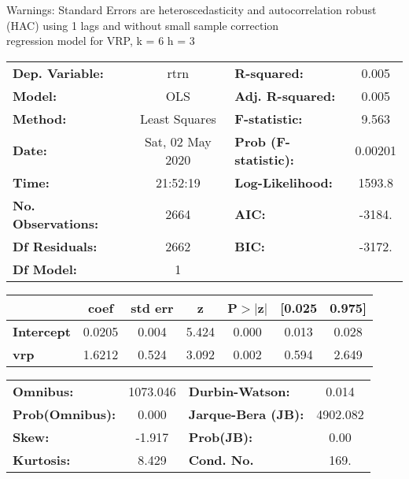 Warnings: \newline
 [1] Standard Errors are heteroscedasticity and autocorrelation robust (HAC) using 1 lags and without small sample correction\\ 

regression model for VRP, k = 6 h = 3\begin{center}
\begin{tabular}{lclc}
\toprule
\textbf{Dep. Variable:}    &       rtrn       & \textbf{  R-squared:         } &     0.005   \\
\textbf{Model:}            &       OLS        & \textbf{  Adj. R-squared:    } &     0.005   \\
\textbf{Method:}           &  Least Squares   & \textbf{  F-statistic:       } &     9.563   \\
\textbf{Date:}             & Sat, 02 May 2020 & \textbf{  Prob (F-statistic):} &  0.00201    \\
\textbf{Time:}             &     21:52:19     & \textbf{  Log-Likelihood:    } &    1593.8   \\
\textbf{No. Observations:} &        2664      & \textbf{  AIC:               } &    -3184.   \\
\textbf{Df Residuals:}     &        2662      & \textbf{  BIC:               } &    -3172.   \\
\textbf{Df Model:}         &           1      & \textbf{                     } &             \\
\bottomrule
\end{tabular}
\begin{tabular}{lcccccc}
                   & \textbf{coef} & \textbf{std err} & \textbf{z} & \textbf{P$> |$z$|$} & \textbf{[0.025} & \textbf{0.975]}  \\
\midrule
\textbf{Intercept} &       0.0205  &        0.004     &     5.424  &         0.000        &        0.013    &        0.028     \\
\textbf{vrp}       &       1.6212  &        0.524     &     3.092  &         0.002        &        0.594    &        2.649     \\
\bottomrule
\end{tabular}
\begin{tabular}{lclc}
\textbf{Omnibus:}       & 1073.046 & \textbf{  Durbin-Watson:     } &    0.014  \\
\textbf{Prob(Omnibus):} &   0.000  & \textbf{  Jarque-Bera (JB):  } & 4902.082  \\
\textbf{Skew:}          &  -1.917  & \textbf{  Prob(JB):          } &     0.00  \\
\textbf{Kurtosis:}      &   8.429  & \textbf{  Cond. No.          } &     169.  \\
\bottomrule
\end{tabular}
\end{center}

